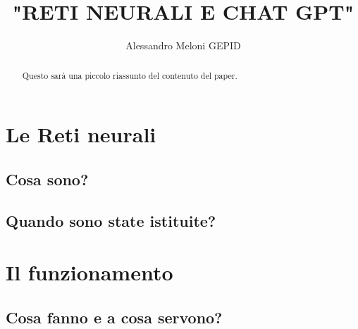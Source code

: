 \documentclass{article}
\title{\textbf{"RETI NEURALI E CHAT GPT"}}
\author{Alessandro Meloni GEPID}
\date{}
\begin{document}
\maketitle
\begin{abstract}
    Questo sarà una piccolo riassunto del contenuto del paper.
\end{abstract}

\centering \tableofcontents
\centering \newpage
\section{Le Reti neurali}

\flushleft \subsection{Cosa sono?}

\flushleft\subsection{Quando sono state istituite?}

\centering \newpage
\section{Il funzionamento}

\flushleft \subsection{Cosa fanno e a cosa servono?}
\end{document}
